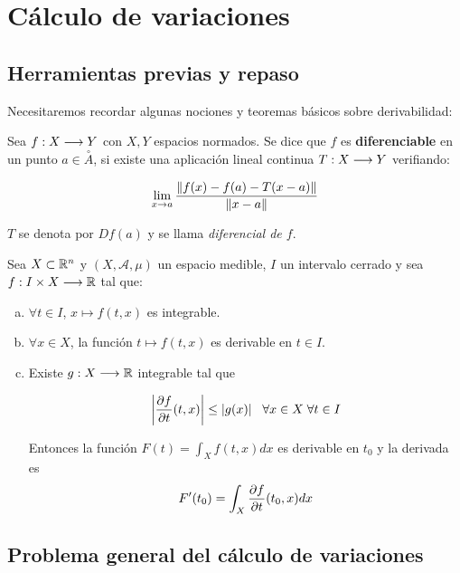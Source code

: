 
\section{Cálculo de variaciones}

\subsection{Herramientas previas y repaso}

Necesitaremos recordar algunas nociones y teoremas básicos sobre derivabilidad:

\begin{definition}
\label{funciondiferenciable}

Sea $f : X \longrightarrow Y$ con $X,Y$ espacios normados. Se dice que $f$ es \textbf{diferenciable} en un punto $a\in\overset{\circ}{A}$, si existe una aplicación lineal continua $T : X \longrightarrow Y$ verifiando:

\[
\displaystyle\lim_{ x \to a } \frac{\left\lVert f(x)-f(a)-T(x-a)\right\rVert}{\left\lVert x-a\right\rVert}
\]

$T$ se denota por $Df(a)$ y se llama \textit{diferencial de $f$}.
\end{definition}

\begin{theorem}
\label{derivadaparametro}
Sea $X\subset\mathbb{R}^n$ y $(X,\mathcal{A},\mu)$ un espacio medible, $I$ un intervalo cerrado y sea $f : I\times X \longrightarrow \mathbb{R}$ tal que:

\begin{enumerate}[(a)]
\item $\forall t \in I$, $x\mapsto f(t,x)$ es integrable.
\item $\forall x\in X$, la función $t\mapsto f(t,x)$ es derivable en $t\in I$.
\item Existe $g : X \longrightarrow \mathbb{R}$ integrable tal que

\[
\left|\frac{\partial f }{\partial t }(t,x)\right|\leq |g(x)| \;\;\; \forall x\in X\; \forall t \in I
\]

Entonces la función $F(t)=\int_Xf(t,x)dx$ es derivable en $t_0$ y la derivada es 
\[
F'(t_0)=\displaystyle\int_X\frac{\partial f }{\partial t }(t_0,x)dx
\]
\end{enumerate}

\end{theorem}

\subsection{Problema general del cálculo de variaciones}

